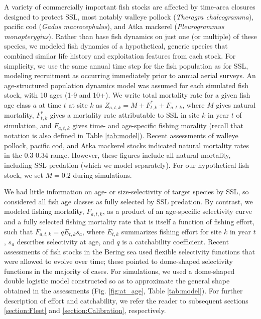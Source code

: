 \documentclass[nonumbib,leqno]{nrc1}
\begin{document}
A variety of commercially important fish stocks are affected by time-area closures designed to protect SSL, most notably walleye pollock ({\it Theragra chalcogramma}), pacific cod ({\it Gadus macrocephalus}), and Atka mackerel ({\it Pleurogrammus monopterygius}).  Rather than base fish dynamics on just one (or multiple) of these species, we modeled fish dynamics of a hypothetical, generic species that combined similar life history and exploitation features from each stock.  For simplicity, we use the same annual time step for the fish population as for SSL, modeling recruitment as occurring immediately prior to annual aerial surveys.  An age-structured population dynamics model was assumed for each simulated fish stock, with 10 ages (1-9 and 10+).
We write total mortality rate for a given fish age class $a$ at time $t$ at site $k$ as $Z_{a,t,k}=M + F_{t,k}^* + F_{a,t,k}$, where $M$ gives
natural mortality, $F_{t,k}^*$ gives a mortality rate attributable to SSL in site $k$ in year $t$ of simulation, and $F_{a,t,k}$ gives time- and age-specific fishing morality (recall that notation is also defined in Table \ref{tab:model}).  Recent assessments of walleye pollock, pacific cod, and Atka mackerel stocks \citep[e.g.][]{PollockAssessment2011,PacCodAssessment2011,AtkaAssessment2012} indicated natural mortality rates in the 0.3-0.34 range.  However, these figures include all natural mortality, including SSL predation (which we model separately).  For our hypothetical fish stock, we set $M=0.2$ during simulations.

We had little information on age- or size-selectivity of target species by SSL, so considered all fish age classes as fully selected by SSL predation.  By contrast, we modeled fishing mortality, $F_{a,t,k}$, as a product of an age-specific selectivity curve and a fully selected fishing mortality rate that is itself a function of fishing effort, such that $F_{a,t,k}=q E_{t,k} s_a$, where $E_{t,k}$ summarizes fishing effort for site $k$ in year $t$, $s_a$ describes selectivity at age, and $q$ is a catchability coefficient.  Recent assessments of fish stocks in the Bering sea used flexible selectivity functions that were allowed to evolve over time; these pointed to dome-shaped selectivity functions in the majority of cases.  For simulations, we used a dome-shaped double logistic model constructed so as to approximate the general shape obtained in the assessments (Fig. \ref{fig:at_age}, Table \ref{tab:model}).  For further description of effort and catchability, we refer the reader to subsequent sections \ref{section:Fleet} and \ref{section:Calibration}, respectively.
\end{document}
